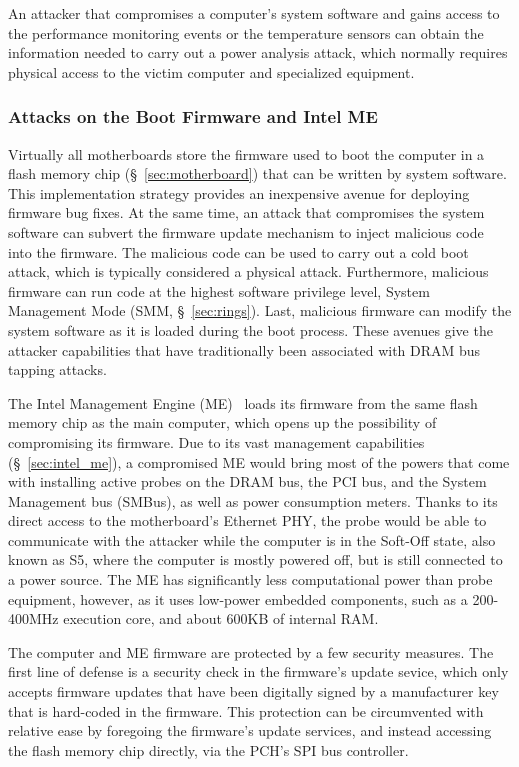 An attacker that compromises a computer's system software and gains access to
the performance monitoring events or the temperature sensors can obtain the
information needed to carry out a power analysis attack, which normally
requires physical access to the victim computer and specialized equipment.


\subsubsection{Attacks on the Boot Firmware and Intel ME}
\label{sec:firmware_attacks}

Virtually all motherboards store the firmware used to boot the computer in a
flash memory chip (\S~\ref{sec:motherboard}) that can be written by system
software. This implementation strategy provides an inexpensive avenue for
deploying firmware bug fixes. At the same time, an attack that compromises the
system software can subvert the firmware update mechanism to inject malicious
code into the firmware. The malicious code can be used to carry out a cold boot
attack, which is typically considered a physical attack. Furthermore, malicious
firmware can run code at the highest software privilege level, System
Management Mode (SMM, \S~\ref{sec:rings}). Last, malicious firmware can modify
the system software as it is loaded during the boot process. These avenues give
the attacker capabilities that have traditionally been associated with DRAM bus
tapping attacks.

The Intel Management Engine (ME)~\cite{ruan2014intelme} loads its firmware
from the same flash memory chip as the main computer, which opens up the
possibility of compromising its firmware. Due to its vast management
capabilities (\S~\ref{sec:intel_me}), a compromised ME would bring most of the
powers that come with installing active probes on the DRAM bus, the PCI bus,
and the System Management bus (SMBus), as well as power consumption meters.
Thanks to its direct access to the motherboard's Ethernet PHY, the probe would
be able to communicate with the attacker while the computer is in the Soft-Off
state, also known as S5, where the computer is mostly powered off, but is still
connected to a power source.  The ME has significantly less computational power
than probe equipment, however, as it uses low-power embedded components, such
as a 200-400MHz execution core, and about 600KB of internal RAM.

The computer and ME firmware are protected by a few security measures. The
first line of defense is a security check in the firmware's update sevice,
which only accepts firmware updates that have been digitally signed by a
manufacturer key that is hard-coded in the firmware. This protection can be
circumvented with relative ease by foregoing the firmware's update services,
and instead accessing the flash memory chip directly, via the PCH's SPI bus
controller.

